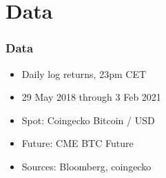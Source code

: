 \documentclass[10pt,mathserif]{beamer}
\renewcommand{\(}{\begin{columns}}
\renewcommand{\)}{\end{columns}}
\newcommand{\<}[1]{\begin{column}{#1}}
\renewcommand{\>}{\end{column}}
\theoremstyle{definition}
\begin{document}
\section{Data}

\begin{frame}
  \frametitle{Data}
  \begin{itemize}
  \item Daily log returns, 23pm CET
  \item 29 May 2018 through 3 Feb 2021
  \item Spot: Coingecko Bitcoin / USD 
  \item Future: CME BTC Future
  \item Sources: Bloomberg, coingecko
  \end{itemize}






\end{frame}
\end{document}
